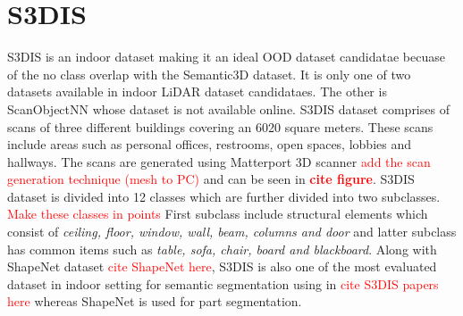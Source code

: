 \section{S3DIS}
S3DIS is an indoor dataset making it an ideal OOD dataset candidatae becuase of the no class overlap with the Semantic3D dataset.
It is only one of two datasets available in indoor LiDAR dataset candidataes. 
The other is ScanObjectNN whose dataset is not available online.
S3DIS dataset comprises of scans of three different buildings covering an 6020 square meters.
These scans include areas such as personal offices, restrooms, open spaces, lobbies and hallways.
The scans are generated using Matterport 3D scanner \textcolor{red}{add the scan generation technique (mesh to PC)} and can be seen in \textcolor{red}{\textbf{cite figure}}.
S3DIS dataset is divided into 12 classes which are further divided into two subclasses.
\textcolor{red}{Make these classes in points}
First subclass include structural elements which consist of \textit{ceiling, floor, window, wall, beam, columns and door}
and latter subclass has common items such as \textit{table, sofa, chair, board and blackboard}.
Along with ShapeNet dataset \textcolor{red}{cite ShapeNet here}, S3DIS is also one of the most evaluated dataset in indoor setting for semantic segmentation  using in \textcolor{red}{cite S3DIS papers here} whereas ShapeNet is used for part segmentation.
